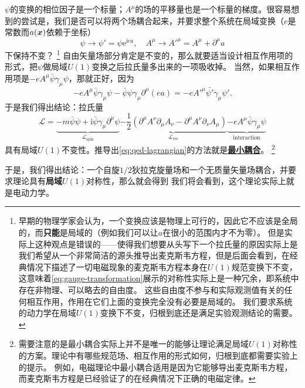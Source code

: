 \documentclass[hyperref, UTF8, a4paper]{ctexart}
\newcommand*{\ii}{\mathrm{i}}
\newcommand*{\ee}{\mathrm{e}}
\newcommand{\concept}[1]{\underline{\textbf{#1}}}
\renewcommand{\emph}{\textbf}
\begin{document}
$\psi$的变换的相位因子是一个标量；$A^\mu$的场的平移量也是一个标量的梯度。很容易想到的尝试是，我们是否可以将两个场耦合起来，并要求整个系统在局域变换（$e$是常数而$a(\vb*{x})$依赖于坐标）
\begin{equation}
    \psi \longrightarrow \psi' = \psi \ee^{\ii e a}, \quad A^\mu \longrightarrow A'^\mu = A^\mu + \partial^\mu a
    \label{eq:gauge-transformation}
\end{equation}
下保持不变？%
\footnote{早期的物理学家会认为，一个变换应该是物理上可行的，因此它不应该是全局的，而\emph{只能}是局域的（例如我们可以让$a$在很小的范围内才不为零）。
但是实际上这种观点是错误的——使得我们想要从头写下一个拉氏量的原因实际上是我们希望从一个非常简洁的源头推导出麦克斯韦方程，但是后面会看到，在经典情况下描述了一切电磁现象的麦克斯韦方程本身在$U(1)$规范变换下不变，这意味着\eqref{eq:gauge-transformation}展示的对称性实际上是一种冗余，即系统中存在非物理、可以略去的自由度。
这些自由度不参与和实际观测值有关的任何相互作用，作用在它们上面的变换完全没有必要是局域的。
我们要求系统的动力学在局域$U(1)$变换下不变，归根到底还是满足实验观测结论的需要。
}%
自由矢量场部分肯定是不变的，那么就要适当设计相互作用项的形式，把$\psi$做局域$U(1)$变换之后拉氏量多出来的一项吸收掉。
当然，如果相互作用项是$- e A^\mu \bar{\psi} \gamma_\mu \psi$，那就正好，因为
\[
    - e A^\mu \bar{\psi} \gamma_\mu \psi - \bar{\psi} \psi \gamma_\mu \partial^\mu (e a) = - e A'^\mu \bar{\psi'} \gamma_\mu \psi'.
\]
于是我们得出结论：拉氏量
\begin{equation}
    \mathcal{L} = 
    \underbrace{- m \bar{\psi} \psi + \ii \bar{\psi} \gamma_\mu \partial^\mu \psi }_{\mathcal{L}_\text{spin}}
    \underbrace{- \frac{1}{2} (\partial^\mu A^\nu \partial_\mu A_\nu - \partial^\mu A^\nu \partial_\nu A_\mu)}_{\mathcal{L}_\text{vec}}
    \underbrace{- e A^\mu \bar{\psi} \gamma_\mu \psi}_\text{interaction}
    \label{eq:qed-lagrangian}
\end{equation}
具有局域$U(1)$不变性。推导出\eqref{eq:qed-lagrangian}的方法就是\concept{最小耦合}。%
\footnote{需要注意的是最小耦合实际上并不是唯一的能够让理论满足局域$U(1)$对称性的方案。理论中有哪些规范场、相互作用的形式如何，归根到底都需要实验上的提示。
例如，电磁理论中最小耦合适用是因为它能够导出麦克斯韦方程，而麦克斯韦方程是已经验证了的在经典情况下正确的电磁定律。}%

于是，我们得出结论：一个自旋$1/2$狄拉克旋量场和一个无质量矢量场耦合，并要求理论具有\emph{局域}$U(1)$对称性，那么就会得到
我们将会看到，这个理论实际上就是电动力学。
\end{document}
